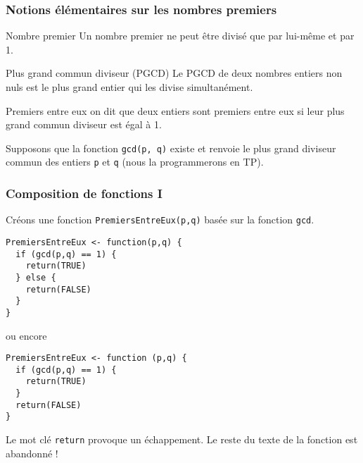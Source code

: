 \documentclass[10pt]{beamer}
\begin{document}

\begin{frame}
  \frametitle{Notions élémentaires sur les nombres premiers}
  \begin{block}{Nombre premier}
    Un nombre premier ne peut être divisé que par lui-même et par 1.
  \end{block}
  \begin{block}{Plus grand commun diviseur (PGCD)}
    Le PGCD de deux nombres entiers non nuls est le plus grand entier qui les divise simultanément.
  \end{block}

  \begin{block}{Premiers entre eux}
    on dit que deux entiers sont premiers entre eux si leur plus grand commun diviseur est égal à 1.
  \end{block}

  Supposons que la fonction \texttt{gcd(p, q)} existe et renvoie le plus grand diviseur commun des entiers \texttt{p} et \texttt{q} (nous la programmerons en TP).
\end{frame}

\begin{frame}[fragile]
  \frametitle{Composition de fonctions I}
  Créons une fonction \texttt{PremiersEntreEux(p,q)} basée sur la fonction \texttt{gcd}.
  \begin{lstlisting}[style=editor]
PremiersEntreEux <- function(p,q) {
  if (gcd(p,q) == 1) {
    return(TRUE)
  } else {
    return(FALSE)
  }
}
\end{lstlisting}
ou encore
\begin{lstlisting}[style=editor]
PremiersEntreEux <- function (p,q) {
  if (gcd(p,q) == 1) {
    return(TRUE)
  }
  return(FALSE)
}
\end{lstlisting}
Le mot clé \alert{\texttt{return} provoque un échappement}.
Le reste du texte de la fonction est abandonné !

\end{frame}
\end{document}
